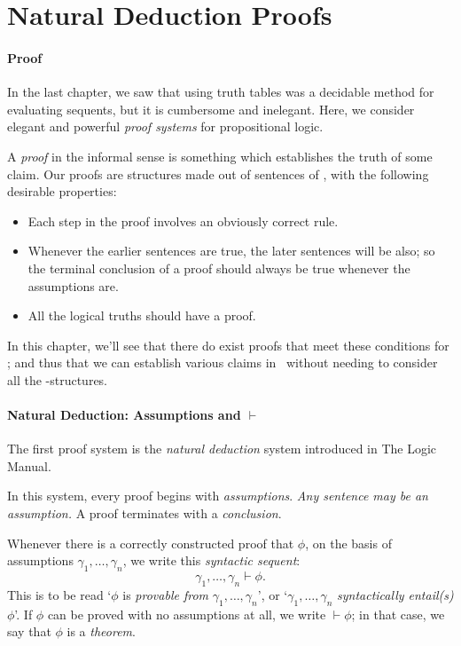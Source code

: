 

\section{Natural Deduction Proofs}
\paragraph{Proof}

In the last chapter, we saw that using truth tables was a decidable method for evaluating sequents, but it is cumbersome and inelegant. Here, we consider elegant and powerful \emph{proof systems} for propositional logic.

A \emph{proof} in the informal sense is something which establishes the truth of some claim. Our proofs are structures made out of sentences of \lone, with the following desirable properties: \begin{itemize}
	\item Each step in the proof involves an obviously correct rule.
	\item Whenever the earlier sentences are true, the later sentences will be also; so the terminal conclusion of a proof should always be true whenever the assumptions are.
	\item All the logical truths should have a proof.
\end{itemize}

In this chapter, we'll see that there do exist proofs that meet these conditions for \lone; and thus that we can establish various claims in \lone\ without needing to consider all the \lone-structures.

\paragraph{Natural Deduction: Assumptions and $\vdash$}

The first proof system is the \emph{natural deduction} system introduced in The Logic Manual. 

In this system, every proof begins with \emph{assumptions}. \emph{Any sentence may be an assumption.} A proof terminates with a \emph{conclusion}. 

 Whenever there is a correctly constructed proof that $\phi$, on the basis of assumptions $\gamma_{1},\ldots,\gamma_{n}$, we write this \emph{syntactic sequent}: {$$\gamma_{1},\ldots,\gamma_{n}\vdash\phi.$$} This is to be read `$\phi$ is \emph{provable from} $\gamma_{1},\ldots,\gamma_{n}$', or `$\gamma_{1},\ldots,\gamma_{n}$ \emph{syntactically entail(s)} $\phi$'. If $\phi$ can be proved with no assumptions at all, we write $\vdash\phi$; in that case, we say that $\phi$ is a \emph{theorem}.

